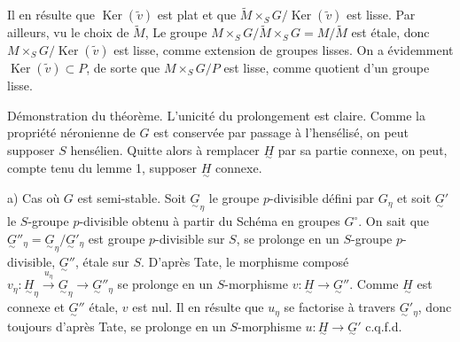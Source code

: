 \documentclass[11pt,a4paper]{article}
\begin{document}

Il en résulte que $\operatorname{Ker}(\widetilde{v})$ est plat et que
$\widetilde{M} \times_S G/\operatorname{Ker}(\widetilde{v})$ est lisse. Par
ailleurs, vu le choix de $\widetilde{M}$, Le groupe
$M \times_S G / \widetilde{M} \times_S G = M/\widetilde{M}$ est étale, donc
$M \times_S G/\operatorname{Ker}(\widetilde{v})$ est lisse, comme extension de
groupes lisses. On a évidemment $\operatorname{Ker}(\widetilde{v}) \subset P$,
de sorte que $M \times_S G/P$ est  lisse, comme quotient d'un
groupe lisse.

Démonstration du théorème. L'unicité du prolongement est claire. Comme la
propriété néronienne de $G$ est conservée par passage à l'hensélisé, on peut
supposer $S$ hensélien. Quitte alors à remplacer $\underset{\sim}{H}$ par sa
partie connexe, on peut, compte tenu du lemme 1, supposer
\struck{\ill{}} $\underset{\sim}{H}$ connexe.

a) Cas où $G$ est semi-stable. Soit $\underset{\sim}{G}_\eta$ le groupe
$p$-divisible défini par $G_\eta$ et soit $\underset{\sim}{G}'$ le
$S$-groupe $p$-divisible obtenu à partir du Schéma en groupes $G^{\circ}$. On
sait que
$\underset{\sim}{G}''_\eta = \underset{\sim}{G}_\eta/\underset{\sim}{G}'_\eta$
est  groupe $p$-divisible   sur $S$,
  se prolonge en un $S$-groupe $p$-divisible,
$\underset{\sim}{G}''$, étale sur $S$. D'après Tate, le morphisme composé
$v_\eta : \underset{\sim}{H}_\eta \xrightarrow{u_\eta}
\underset{\sim}{G}_\eta \to \underset{\sim}{G}''_\eta$ se prolonge en un
$S$-morphisme $v : \underset{\sim}{H} \to \underset{\sim}{G}''$. Comme
$\underset{\sim}{H}$ est connexe et $\underset{\sim}{G}''$ étale, $v$ est nul.
 Il en résulte que $u_\eta$ se factorise à travers
$\underset{\sim}{G}'_\eta$, donc toujours d'après Tate, se prolonge en un
$S$-morphisme $u : \underset{\sim}{H} \to \underset{\sim}{G}'$ c.q.f.d.
\end{document}

